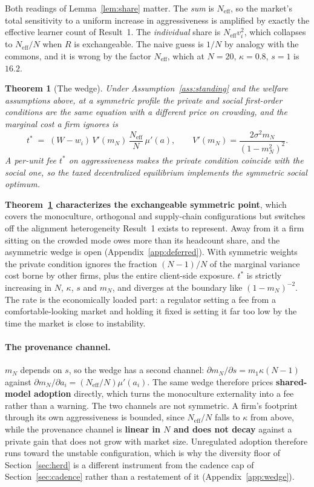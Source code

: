 \documentclass{article}
\theoremstyle{plain}
\newtheorem{theorem}{Theorem}
\theoremstyle{definition}
\newcommand{\Neff}{N_{\mathrm{eff}}}
\newcommand{\mN}{m_N}
\begin{document}
Both readings of Lemma~\ref{lem:share} matter. The \emph{sum} is $\Neff$, so the market's total sensitivity to a uniform increase in aggressiveness is amplified by exactly the effective learner count of Result~1. The \emph{individual} share is $\Neff v_i^2$, which collapses to $\Neff/N$ when $R$ is exchangeable. The naive guess is $1/N$ by analogy with the commons, and it is wrong by the factor $\Neff$, which at $N=20$, $\kappa=0.8$, $s=1$ is $16.2$.

\begin{theorem}[The wedge]
\label{thm:wedge}
Under Assumption~\ref{ass:standing} and the welfare assumptions above, at a symmetric profile the private and social first-order conditions are the same equation with a different price on crowding, and the marginal cost a firm ignores is
\begin{equation}
t^{*} \;=\; (W - w_i)\, V'(\mN)\, \frac{\Neff}{N}\, \mu'(a), \qquad V'(\mN) = \frac{2\sigma^2 \mN}{(1-\mN^2)^2}.
\end{equation}
A per-unit fee $t^{*}$ on aggressiveness makes the private condition coincide with the social one, so the taxed decentralized equilibrium implements the symmetric social optimum.
\end{theorem}

\textbf{Theorem~\ref{thm:wedge} characterizes the exchangeable symmetric point}, which covers the monoculture, orthogonal and supply-chain configurations but switches off the alignment heterogeneity Result~1 exists to represent. Away from it a firm sitting on the crowded mode owes more than its headcount share, and the asymmetric wedge is open (Appendix~\ref{app:deferred}). With symmetric weights the private condition ignores the fraction $(N-1)/N$ of the marginal variance cost borne by other firms, plus the entire client-side exposure. $t^{*}$ is strictly increasing in $N$, $\kappa$, $s$ and $\mN$, and diverges at the boundary like $(1-\mN)^{-2}$. The rate is the economically loaded part: a regulator setting a fee from a comfortable-looking market and holding it fixed is setting it far too low by the time the market is close to instability.

\paragraph{The provenance channel.}
$\mN$ depends on $s$, so the wedge has a second channel: $\partial \mN/\partial s = m_1\kappa(N-1)$ against $\partial\mN/\partial a_i = (\Neff/N)\mu'(a_i)$. The same wedge therefore prices \textbf{shared-model adoption} directly, which turns the monoculture externality into a fee rather than a warning. The two channels are not symmetric. A firm's footprint through its own aggressiveness is bounded, since $\Neff/N$ falls to $\kappa$ from above, while the provenance channel is \textbf{linear in $N$ and does not decay} against a private gain that does not grow with market size. Unregulated adoption therefore runs toward the unstable configuration, which is why the diversity floor of Section~\ref{sec:herd} is a different instrument from the cadence cap of Section~\ref{sec:cadence} rather than a restatement of it (Appendix~\ref{app:wedge}).
\end{document}

